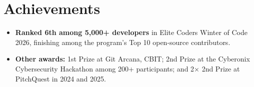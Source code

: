 \documentclass[letterpaper,11pt]{article}
\newcommand{\resumeItem}[1]{
  \item\small{
    {#1 \vspace{-2pt}}
  }
}
\newcommand{\resumeItemListStart}{\begin{itemize}}
\newcommand{\resumeItemListEnd}{\end{itemize}\vspace{-5pt}}
\begin{document}

\section{Achievements}
\resumeItemListStart

  \resumeItem{\textbf{Ranked 6th among 5,000+ developers} in Elite Coders Winter of Code 2026, finishing among the program's Top 10 open-source contributors.}

  \resumeItem{\textbf{Other awards:} 1st Prize at Git Arcana, CBIT; 2nd Prize at the Cyberonix Cybersecurity Hackathon among 200+ participants; and 2× 2nd Prize at PitchQuest in 2024 and 2025.}

\resumeItemListEnd

\end{document}

